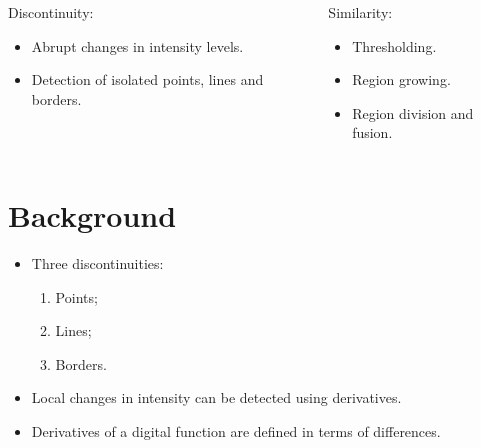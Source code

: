 \begin{frame}
\begin{columns}
\begin{column}{.5\textwidth}
Discontinuity:
\begin{itemize}
\item Abrupt changes in intensity levels.
\item Detection of isolated points, lines and borders.
\end{itemize}
\end{column}
\begin{column}{.5\textwidth}
Similarity:
\begin{itemize}
\item Thresholding.
\item Region growing.
\item Region division and fusion.
\end{itemize}
\end{column}
\end{columns}
\end{frame}


\section{Background}

\begin{frame}
\begin{itemize}
\item Three discontinuities:
\begin{enumerate}
\item Points;
\item Lines;
\item Borders.
\end{enumerate}
\item Local changes in intensity can be detected using derivatives.
\item Derivatives of a digital function are defined in terms of differences.
\end{itemize}
\end{frame}

